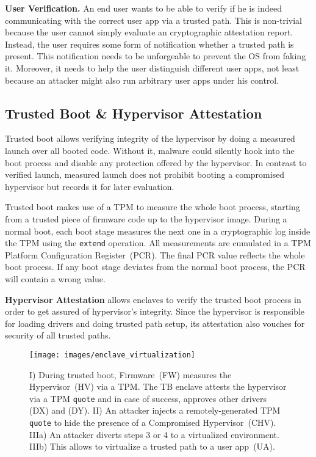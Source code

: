 \documentclass{sig-alternate-05-2015}
\begin{document}
\textbf{User Verification.}
An end user wants to be able to verify if he is indeed communicating with the correct user app via a trusted path. 
This is non-trivial because the user cannot simply evaluate an cryptographic attestation report. 
Instead, the user requires some form of notification whether a trusted path is present. 
This notification needs to be unforgeable to prevent the OS from faking it. 
Moreover, it needs to help the user distinguish different user apps, not least because an attacker might also run arbitrary user apps under his control.



\subsection{Trusted Boot \& Hypervisor Attestation}\label{sec:hypervisor_attest}
Trusted boot allows verifying integrity of the hypervisor by doing a measured launch over all booted code. 
Without it, malware could silently hook into the boot process and disable any protection offered by the hypervisor. 
In contrast to verified launch, measured launch does not prohibit booting a compromised hypervisor but records it for later evaluation. 

Trusted boot makes use of a TPM to measure the whole boot process, starting from a trusted piece of firmware code up to the hypervisor image. 
During a normal boot, each boot stage measures the next one in a cryptographic log inside the TPM using the \texttt{extend} operation. 
All measurements are cumulated in a TPM Platform Configuration Register~(PCR). 
The final PCR value reflects the whole boot process. 
If any boot stage deviates from the normal boot process, the PCR will contain a wrong value.


\textbf{Hypervisor Attestation}
allows enclaves to verify the trusted boot process in order to get assured of hypervisor's integrity. 
Since the hypervisor is responsible for loading drivers and doing trusted path setup, its attestation also vouches for security of all trusted paths. 

\begin{figure*}[t]
\centering
\texttt{[image: images/enclave\_virtualization]}
\caption{I) During trusted boot, Firmware~(FW) measures the Hypervisor~(HV) via a TPM. 
The TB enclave attests the hypervisor via a TPM \texttt{quote} and in case of success, approves other drivers (DX) and (DY). 
II) An attacker injects a remotely-generated TPM \texttt{quote} to hide the presence of a Compromised Hypervisor~(CHV). 
IIIa) An attacker diverts steps 3 or 4 to a virtualized environment. 
IIIb) This allows to virtualize a trusted path to a user app~(UA).}
\label{fig:hv_attack}
\end{figure*}
\end{document}
